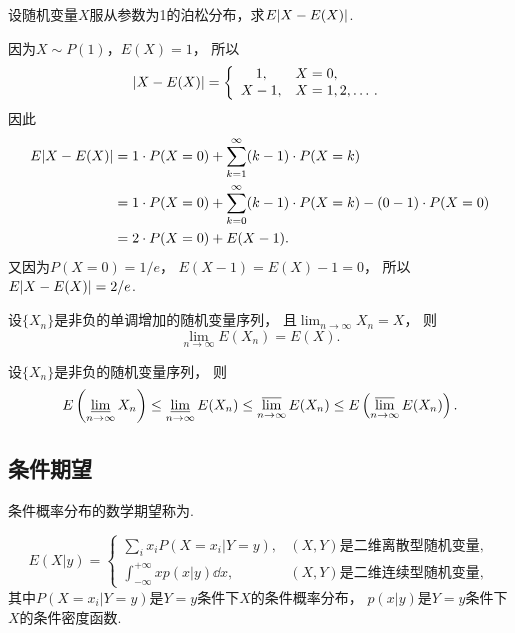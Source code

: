 \begin{example}
设随机变量\(X\)服从参数为1的泊松分布，求\(E\abs{X-E(X)}\).
\begin{solution}
因为\(X \sim P(1)\)，\(E(X) = 1\)，
所以\begin{equation*}
	\abs{X-E(X)} = \left\{ \begin{array}{cl}
		1, & X=0, \\
		X - 1, & X=1,2,\dotsc.
	\end{array} \right.
\end{equation*}
因此\begin{align*}
	E\abs{X-E(X)}
	&= 1 \cdot P(X=0)
	+ \sum_{k=1}^\infty (k-1) \cdot P(X=k) \\
	&= 1 \cdot P(X=0)
	+ \sum_{k=0}^\infty (k-1) \cdot P(X=k)
	- (0-1) \cdot P(X=0) \\
	&= 2 \cdot P(X=0)
	+ E(X-1).
\end{align*}
又因为\(P(X=0)=1/e\)，
\(E(X-1) = E(X) - 1 = 0\)，
所以\(E\abs{X-E(X)} = 2/e\).
\end{solution}
\end{example}

\begin{property}%
设\(\{X_n\}\)是非负的单调增加的随机变量序列，
且\(\lim_{n\to\infty} X_n = X\)，
则\begin{equation*}
	\lim_{n\to\infty} E(X_n) = E(X).
\end{equation*}
\end{property}

\begin{property}%
设\(\{X_n\}\)是非负的随机变量序列，
则\begin{equation*}
	E\left( \varliminf_{n\to\infty} X_n \right)
	\leq \varliminf_{n\to\infty} E(X_n)
	\leq \varlimsup_{n\to\infty} E(X_n)
	\leq E\left( \varlimsup_{n\to\infty} E(X_n) \right).
\end{equation*}
\end{property}

\subsection{条件期望}
\begin{definition}
条件概率分布的数学期望称为.
\end{definition}
\begin{equation}
	E(X \vert y)
	= \left\{ \begin{array}{cl}
		\sum_i x_i P(X=x_i \vert Y = y),
		& \text{$(X,Y)$是二维离散型随机变量}, \\
		\int_{-\infty}^{+\infty} x p(x \vert y) \dd{x},
		& \text{$(X,Y)$是二维连续型随机变量},
	\end{array} \right.
\end{equation}
其中\(P(X=x_i \vert Y=y)\)是\(Y=y\)条件下\(X\)的条件概率分布，
\(p(x \vert y)\)是\(Y=y\)条件下\(X\)的条件密度函数.

